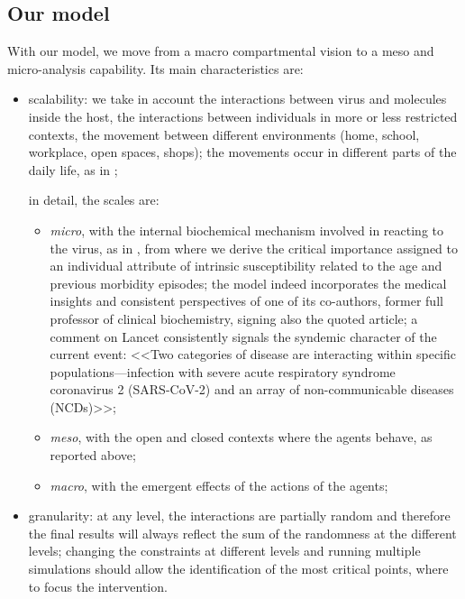\documentclass[graybox]{svmult}
\begin{document}
\subsection{Our model}
\label{ourModel}

With our model, we move from a macro compartmental vision to a meso and micro-analysis capability. Its main characteristics are:

\begin{itemize}

\item
scalability: we take in account the interactions between virus and molecules inside the host, the interactions between individuals in more or less restricted contexts, the movement between different environments (home, school, workplace, open spaces, shops); the movements occur in different parts of the daily life, as in  \cite{ghorbani2020assocc};

in detail, the scales are: 

\begin{itemize}
\item
	\emph{micro}, with the internal biochemical mechanism involved in reacting to the virus, as in \cite{Silvagno_2020}, from where we derive the critical importance assigned to an individual attribute of intrinsic susceptibility related to the age and previous morbidity episodes; the model indeed incorporates the medical insights and consistent perspectives of one of its co-authors, former full professor of clinical biochemistry, signing also the quoted article; a comment on Lancet \cite{horton2020offline} consistently signals the syndemic character of the current event: <<Two categories of disease are interacting within specific populations---infection with severe acute respiratory syndrome coronavirus 2 (SARS-CoV-2) and an array of non-communicable diseases (NCDs)>>;
\item
	\emph{meso}, with the open and closed contexts where the agents behave, as reported above;
\item	
	\emph{macro}, with the emergent effects of the actions of the agents;
	
\end{itemize}

\item
granularity: at any level, the interactions are partially random and therefore the final results will always reflect the sum of the randomness at the different levels; changing the constraints at different levels and running multiple simulations should allow the identification of the most critical points, where to focus the intervention.

\end{itemize}
\end{document}
